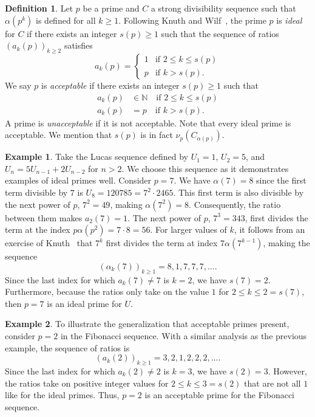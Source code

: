\documentclass{amsart}
\theoremstyle{definition}
\newtheorem*{example*}{Example}
\newtheorem*{definition*}{Definition}
\newcommand{\N}{\mathbb{N}}
\begin{document}
\begin{definition*}
Let $p$ be a prime and $C$ a strong divisibility sequence such that $\alpha(p^k)$ is defined for all $k \geq 1$. Following Knuth and Wilf~\cite{KnuthWilf1989}, the prime $p$ is \emph{ideal} for $C$ if there exists an integer $s(p) \geq 1$ such that the sequence of ratios $(a_k(p))_{k \geq 2}$ satisfies
\[
a_k(p) =
\begin{cases}
1 & \text{if } 2 \leq k \leq s(p) \\
p & \text{if } k > s(p).
\end{cases}
\]
We say $p$ is \textit{acceptable} if there exists an integer $s(p) \geq 1$ such that \begin{align*}
a_k(p) &\in \N \quad \text{if } 2 \leq k \leq s(p) \\
a_k(p) &= p \quad \text{if } k > s(p).
\end{align*}
A prime is \emph{unacceptable} if it is not acceptable.
Note that every ideal prime is acceptable.
We mention that $s(p)$ is in fact $\nu_p\!\left(C_{\alpha(p)}\right)$. 
\end{definition*}

\begin{example*}
Take the Lucas sequence defined by $U_1=1$, $U_2=5$, and $U_n=5U_{n-1}+2U_{n-2}$ for $n > 2$. We choose this sequence as it demonstrates examples of ideal primes well. Consider $p=7$. We have $\alpha(7)=8$ since the first term divisible by $7$ is $U_8=120785=7^2\cdot2465$. This first term is also divisible by the next power of $p$, $7^2=49$, making $\alpha(7^2)=8$. Consequently, the ratio between them makes $a_2(7)=1$. The next power of $p$, $7^3=343$, first divides the term at the index $p\alpha(p^2)=7\cdot8=56$. For larger values of $k$, it follows from an exercise of Knuth~\cite[Exercise 3.2.2-11]{TAOCP} that $7^k$ first divides the term at index $7\alpha(7^{k-1})$, making the sequence $$(\alpha_k(7))_{k\geq1}=8,1,7,7,7,\ldots.$$
Since the last index for which $a_k(7)\neq7$ is $k=2$, we have $s(7) = 2$. Furthermore, because the ratios only take on the value $1$ for $2 \leq k \leq 2 = s(7)$, then $p=7$ is an ideal prime for $U$.
\end{example*}

\begin{example*}
To illustrate the generalization that acceptable primes present, consider $p=2$ in the Fibonacci sequence. With a similar analysis as the previous example, the sequence of ratios is $$(a_k(2))_{k\geq1}=3,2,1,2,2,2,\ldots.$$
Since the last index for which  $a_k(2)\neq2$ is $k=3$, we have $s(2)=3$. However, the ratios take on positive integer values for $2 \leq k \leq 3=s(2)$ that are not all $1$ like for the ideal primes. Thus, $p=2$ is an acceptable prime for the Fibonacci sequence.
\end{example*}
\end{document}
